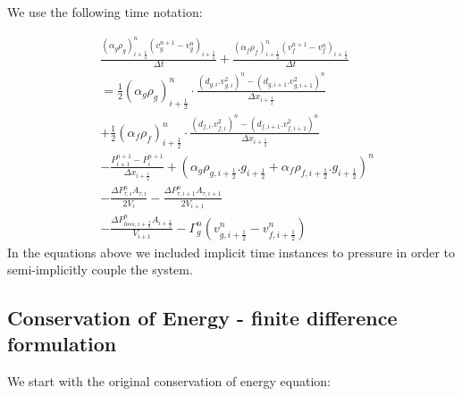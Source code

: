 \documentclass[11pt,letterpaper,titlepage]{article}
\newcommand{\half}{\frac{1}{2}}
\begin{document}
\noindent We use the following time notation:

\begin{equation} \label{eq:mixmomm}
\begin{aligned}
&\frac{(\alpha_g\rho_g )_{i+\half}^{n} (v_g^{n+1}-v_g^{n})_{i+\half}}{\Delta t}+\frac{(\alpha_f\rho_f )_{i+\half}^{n} (v_f^{n+1}-v_f^{n})_{i+\half}}{\Delta t}\\
&=\half (\alpha_g \rho_{g})_{i+\half}^n \cdot\frac{(d_{g,i}.v_{g,i}^2)^n-(d_{g,i+1}.v_{g,i+1}^2)^n}{\Delta x_{i+\half}} \\
&+\half (\alpha_f \rho_{f})_{i+\half}^n \cdot\frac{(d_{f,i}.v_{f,i}^2)^n-(d_{f,i+1}.v_{f,i+1}^2)^n}{\Delta x_{i+\half}} \\
&-\frac{P_{i+1}^{n+1}-P_i^{n+1}}{\Delta x_{i+\half}} + (\alpha_g \rho_{g,i+\half}.g_{i+\half} + \alpha_f\rho_{f,i+\half}.g_{i+\half})^n\\
&-\frac{\Delta P_{\tau,i}^n A_{\tau,i}}{2V_i}-\frac{\Delta P_{\tau,i+1}^n A_{\tau,i+1}}{2V_{i+1}} \\
&-\frac{\Delta P_{loss,i+\half}^n A_{i+\half}}{V_{i+1}} - \Gamma_g^n (v_{g,i+\half}^n - v_{f,i+\half}^n)
\end{aligned}
\end{equation}
\newline
\noindent In the equations above we included implicit time instances to pressure in order to semi-implicitly couple the system.

\newpage
\subsection{Conservation of Energy - finite difference formulation}
We start with the original conservation of energy equation:
\end{document}
